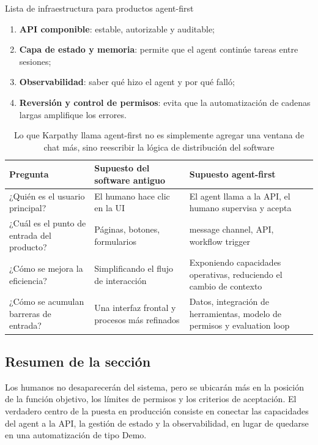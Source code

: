 \begin{knowledgebox}{Lista de infraestructura para productos agent-first}
\begin{enumerate}
    \item \textbf{API componible}: estable, autorizable y auditable;
    \item \textbf{Capa de estado y memoria}: permite que el agent continúe tareas entre sesiones;
    \item \textbf{Observabilidad}: saber qué hizo el agent y por qué falló;
    \item \textbf{Reversión y control de permisos}: evita que la automatización de cadenas largas amplifique los errores.
\end{enumerate}
\end{knowledgebox}

\begin{table}[H]
\centering
\begin{tabular}{p{3.0cm}p{4.1cm}p{4.8cm}}
\toprule
\textbf{Pregunta} & \textbf{Supuesto del software antiguo} & \textbf{Supuesto agent-first} \\
\midrule
¿Quién es el usuario principal? & El humano hace clic en la UI & El agent llama a la API, el humano supervisa y acepta \\
¿Cuál es el punto de entrada del producto? & Páginas, botones, formularios & message channel, API, workflow trigger \\
¿Cómo se mejora la eficiencia? & Simplificando el flujo de interacción & Exponiendo capacidades operativas, reduciendo el cambio de contexto \\
¿Cómo se acumulan barreras de entrada? & Una interfaz frontal y procesos más refinados & Datos, integración de herramientas, modelo de permisos y evaluation loop \\
\bottomrule
\end{tabular}
\caption{Lo que Karpathy llama agent-first no es simplemente agregar una ventana de chat más, sino reescribir la lógica de distribución del software}
\end{table}

\subsection{Resumen de la sección}
Los humanos no desaparecerán del sistema, pero se ubicarán más en la posición de la función objetivo, los límites de permisos y los criterios de aceptación. El verdadero centro de la puesta en producción consiste en conectar las capacidades del agent a la API, la gestión de estado y la observabilidad, en lugar de quedarse en una automatización de tipo Demo.


